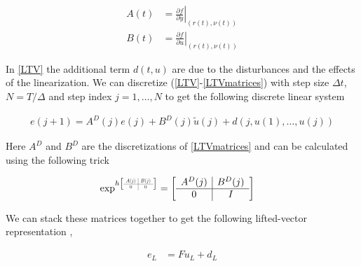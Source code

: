 \documentclass[10pt,a4paper]{article}
\newcommand\at[2]{\left.#1\right|_{#2}} %
\newcommand\scalemath[2]{\scalebox{#1}{\mbox{\ensuremath{\displaystyle #2}}}} %
\newcommand{\state}{y} %
\newcommand{\error}{e} %
\newcommand{\traj}{r} %
\newcommand{\linDist}{d} %
\newcommand{\sysInput}{u} %
\newcommand{\linInput}{\tilde{u}} %
\newcommand{\trjInput}{\nu} %
\newcommand{\dynamics}{f}
\begin{document}
\begin{equation}
\begin{aligned}
A(t) &= \at{\frac{\partial{\dynamics}}{\partial{\state}}}{(\traj(t),\trjInput(t))} \\
B(t) &= \at{\frac{\partial{\dynamics}}{\partial{\sysInput}}}{(\traj(t),\trjInput(t))}
\end{aligned}
\label{LTVmatrices}
\end{equation}

\noindent In \eqref{LTV} the additional term $\linDist(t,\sysInput)$ are due to the disturbances and the effects of the linearization. We can discretize (\ref{LTV}-\ref{LTVmatrices}) with step size $\Delta t$, $N = T/\Delta$ and step index $j = 1, \ldots, N$ to get the following discrete linear system

\begin{equation}
\begin{aligned}
\error(j+1) = A^{D}(j)\error(j) + B^{D}(j)\linInput(j) + \linDist(j, \sysInput(1), \ldots, \sysInput(j))
\end{aligned}
\label{discreteLTV}
\end{equation}

\noindent Here $A^D$ and $B^D$ are the discretizations of \eqref{LTVmatrices} and can be calculated using the following trick \cite{Schoellig12}

\begin{equation}
\begin{aligned}
\exp^{h
\left[
\scalemath{0.5}{
\begin{array}{c|c}
A(j) & B(j) \\ \hline
0 & 0
\end{array}}\right]}
&= 
\left[
\begin{array}{c|c}
A^{D}(j) & B^{D}(j) \\ \hline
0 & I
\end{array}\right] 
\end{aligned}
\label{discreteMatrices}
\end{equation}

\noindent We can stack these matrices together to get the following lifted-vector representation \cite{Bristow06}, \cite{Schoellig12}

\begin{equation}
\begin{aligned}
\error_L &= F\sysInput_L + \linDist_L \\
\end{aligned}
\label{liftedLTV}
\end{equation}
\end{document}
